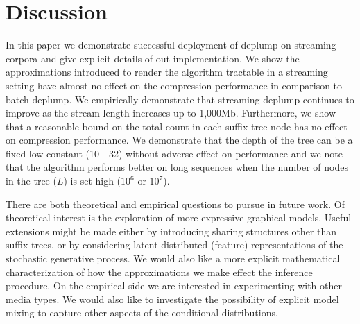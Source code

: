 \section{Discussion}
\label{sec:discussion}

In this paper we demonstrate successful deployment of deplump on streaming corpora and give explicit details of out implementation.  We show the approximations introduced to render the algorithm tractable in a streaming setting have almost no effect on the compression performance in comparison to batch deplump.  We empirically demonstrate that streaming deplump continues to improve as the stream length increases up to 1,000Mb.  Furthermore, we show that a reasonable bound on the total count in each suffix tree node has no effect on compression performance. We demonstrate that the depth of the tree can be a fixed low constant (10 - 32) without adverse effect on performance and we note that the algorithm performs better on long sequences when the number of nodes in the tree ($L$) is set high ($10^6$ or $10^7$).

There are both theoretical and empirical questions to pursue in future work.  Of theoretical interest is the exploration of more expressive graphical models. Useful extensions might be made either by introducing sharing structures other than suffix trees, or by considering latent distributed (feature) representations of the stochastic generative process.  We would also like a more explicit mathematical characterization of how the approximations we make effect the inference procedure.  On the empirical side we are interested in experimenting with other media types.  We would also like to investigate the possibility of explicit model mixing to capture other aspects of the conditional distributions.  